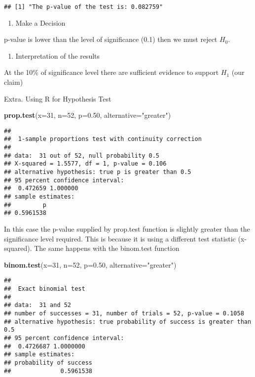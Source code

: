 \documentclass[
]{article}
\newenvironment{Shaded}{\begin{snugshade}}{\end{snugshade}}
\newcommand{\AttributeTok}[1]{\textcolor[rgb]{0.13,0.29,0.53}{#1}}
\newcommand{\DecValTok}[1]{\textcolor[rgb]{0.00,0.00,0.81}{#1}}
\newcommand{\FloatTok}[1]{\textcolor[rgb]{0.00,0.00,0.81}{#1}}
\newcommand{\FunctionTok}[1]{\textcolor[rgb]{0.13,0.29,0.53}{\textbf{#1}}}
\newcommand{\NormalTok}[1]{#1}
\newcommand{\StringTok}[1]{\textcolor[rgb]{0.31,0.60,0.02}{#1}}
\providecommand{\tightlist}{%
  \setlength{\itemsep}{0pt}\setlength{\parskip}{0pt}}
\begin{document}
\begin{verbatim}
## [1] "The p-value of the test is: 0.082759"
\end{verbatim}

\begin{enumerate}
\def\labelenumi{\arabic{enumi}.}
\setcounter{enumi}{3}
\tightlist
\item
  Make a Decision
\end{enumerate}

p-value is lower than the level of significance (0.1) then we must
reject \(H_{0}\).

\begin{enumerate}
\def\labelenumi{\arabic{enumi}.}
\setcounter{enumi}{4}
\tightlist
\item
  Interpretation of the results
\end{enumerate}

At the 10\% of significance level there are sufficient evidence to
support \(H_{1}\) (our claim)

Extra. Using R for Hypothesis Test

\begin{Shaded}
\begin{Highlighting}[]
\FunctionTok{prop.test}\NormalTok{(}\AttributeTok{x=}\DecValTok{31}\NormalTok{, }\AttributeTok{n=}\DecValTok{52}\NormalTok{, }\AttributeTok{p=}\FloatTok{0.50}\NormalTok{, }\AttributeTok{alternative=}\StringTok{"greater"}\NormalTok{)}
\end{Highlighting}
\end{Shaded}

\begin{verbatim}
## 
##  1-sample proportions test with continuity correction
## 
## data:  31 out of 52, null probability 0.5
## X-squared = 1.5577, df = 1, p-value = 0.106
## alternative hypothesis: true p is greater than 0.5
## 95 percent confidence interval:
##  0.472659 1.000000
## sample estimates:
##         p 
## 0.5961538
\end{verbatim}

In this case the p-value supplied by prop.test function is slightly
greater than the significance level required. This is because it is
using a different test statistic (x-squared). The same happens with the
binom.test function

\begin{Shaded}
\begin{Highlighting}[]
\FunctionTok{binom.test}\NormalTok{(}\AttributeTok{x=}\DecValTok{31}\NormalTok{, }\AttributeTok{n=}\DecValTok{52}\NormalTok{, }\AttributeTok{p=}\FloatTok{0.50}\NormalTok{, }\AttributeTok{alternative=}\StringTok{"greater"}\NormalTok{)}
\end{Highlighting}
\end{Shaded}

\begin{verbatim}
## 
##  Exact binomial test
## 
## data:  31 and 52
## number of successes = 31, number of trials = 52, p-value = 0.1058
## alternative hypothesis: true probability of success is greater than 0.5
## 95 percent confidence interval:
##  0.4726687 1.0000000
## sample estimates:
## probability of success 
##              0.5961538
\end{verbatim}
\end{document}
